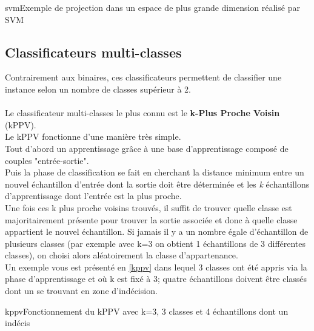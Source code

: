 \documentclass[poster]{polytech/polytech}
\begin{document}
\begin{Figure}{svm}{Exemple de projection dans un espace de plus grande dimension réalisé par SVM}
\end{Figure}


\subsection{Classificateurs multi-classes}
Contrairement aux binaires, ces classificateurs permettent de classifier une instance selon un nombre de classes supérieur à 2.\\
\\
Le classificateur multi-classes le plus connu est le \textbf{k-Plus Proche Voisin} (kPPV).\\
Le kPPV fonctionne d'une manière très simple.\\
Tout d'abord un apprentissage grâce à une base d'apprentissage composé de couples "entrée-sortie".\\
Puis la phase de classification se fait en cherchant la distance minimum entre un nouvel échantillon d'entrée dont la sortie doit être déterminée et les \textit{k} échantillons d'apprentissage dont l'entrée est la plus proche.\\
Une fois ces k plus proche voisins trouvés, il suffit de trouver quelle classe est majoritairement présente pour trouver la sortie associée et donc à quelle classe appartient le nouvel échantillon. Si jamais il y a un nombre égale d'échantillon de plusieurs classes (par exemple avec k=3 on obtient 1 échantillons de 3 différentes classes), on choisi alors aléatoirement la classe d'appartenance.\\
Un exemple vous est présenté en \autoref{kppv} dans lequel 3 classes ont été appris via la phase d'apprentissage et où k est fixé à 3; quatre échantillons doivent être classés dont un se trouvant en zone d'indécision.

\begin{Figure}{kppv}{Fonctionnement du kPPV avec k=3, 3 classes et 4 échantillons dont un indécis}
\end{Figure}
\end{document}
